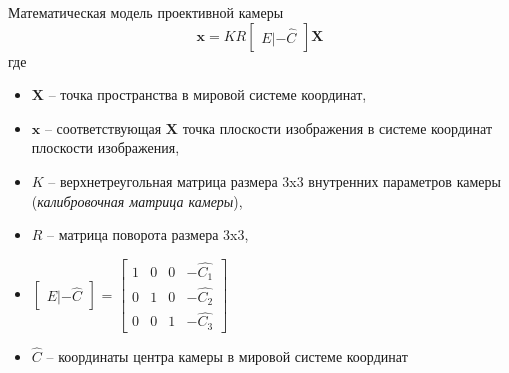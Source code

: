 
\begin{frame}{Математическая модель проективной камеры}
    \begin{equation*}
    \textbf{x} = KR\begin{bmatrix}E | -\hat{C}\end{bmatrix}\textbf{X}
\end{equation*}
где
\begin{itemize}[noitemsep]
    \item $\textbf{X}$ -- точка пространства в мировой системе координат,
    \item $\textbf{x}$ -- соответствующая $\textbf{X}$ точка плоскости изображения в системе координат плоскости изображения,
    \item $K$ -- верхнетреугольная матрица размера $3$x$3$ внутренних параметров камеры (\textit{калибровочная матрица камеры}),
    \item $R$ -- матрица поворота размера $3$x$3$,  
    \item $\begin{bmatrix}E | -\hat{C}\end{bmatrix}$  = $\begin{bmatrix} 
    1 & 0 & 0 & -\hat{C_{1}} \\
    0 & 1 & 0 & -\hat{C_{2}} \\ 
    0 & 0 & 1 & -\hat{C_{3}} \end{bmatrix}$
    \item $\hat{C}$ -- координаты центра камеры в мировой системе координат
\end{itemize}
\end{frame}